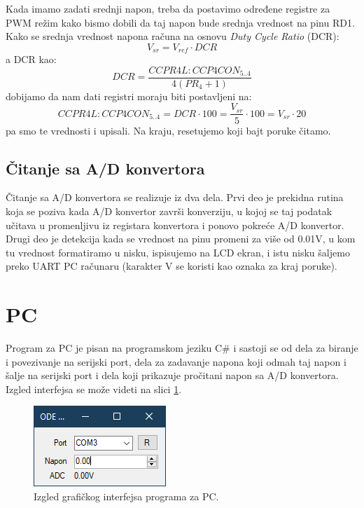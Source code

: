 \documentclass{report}
\begin{document}
            Kada imamo zadati srednji napon, treba da postavimo određene registre za PWM režim kako bismo dobili da taj napon bude srednja vrednost na pinu RD1. Kako se srednja vrednost napona računa na osnovu \textit{Duty Cycle Ratio} (DCR):
            $$V_{sr} = V_{ref} \cdot DCR$$
            a DCR kao:
            $$DCR = \frac{CCPR4L:CCP4CON_{5..4}}{4(PR_4 + 1)}$$
            dobijamo da nam dati registri moraju biti postavljeni na:
            $$CCPR4L:CCP4CON_{5..4} = DCR \cdot 100 = \frac{V_{sr}}{5} \cdot 100 = V_{sr} \cdot 20$$
            pa smo te vrednosti i upisali. Na kraju, resetujemo koji bajt poruke čitamo.
        \subsection*{Čitanje sa A/D konvertora}
            Čitanje sa A/D konvertora se realizuje iz dva dela. Prvi deo je prekidna rutina koja se poziva kada A/D konvertor završi konverziju, u kojoj se taj podatak učitava u promenljivu iz registara konvertora i ponovo pokreće A/D konvertor. Drugi deo je detekcija kada se vrednost na pinu promeni za više od 0.01V, u kom tu vrednost formatiramo u nisku, ispisujemo na LCD ekran, i istu nisku šaljemo preko UART PC računaru (karakter V se koristi kao oznaka za kraj poruke).
    \section*{PC}
        Program za PC je pisan na programskom jeziku C\# i sastoji se od dela za biranje i povezivanje na serijski port, dela za zadavanje napona koji odmah taj napon i šalje na serijski port i dela koji prikazuje pročitani napon sa A/D konvertora. Izgled interfejsa se može videti na slici \ref{GUI}.
        \begin{figure}[H]
            \centering
            \includegraphics[scale=3]{GUI.png}
            \caption{Izgled grafičkog interfejsa programa za PC.}
            \label{GUI}
        \end{figure}
\end{document}
